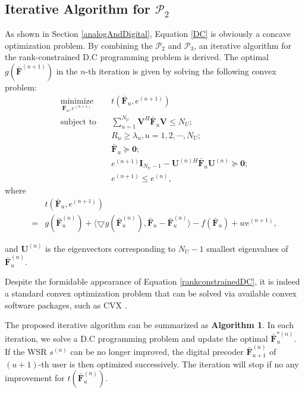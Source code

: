 \documentclass[10pt,journal,twocolumn,twoside]{IEEEtran}
\begin{document}
\subsection{Iterative Algorithm for $\mathcal{P}_2$}
As shown in Section \ref{analogAndDigital}, Equation \eqref{DC} is obviously a concave optimization problem.
By combining the $\mathcal{P}_2$ and $\mathcal{P}_3$, an iterative algorithm for the rank-constrained D.C programming problem is derived.
The optimal $g(\bar{\bm{F}}^{(n+1)})$ in the $n$-th iteration is given by solving the following convex problem:
\begin{align} \label{rankconstrainedDC}
\underset{\bar{\bm{F}}_u, e^{(n+1)}}{\text{minimize}}  & \quad  t(\bar{\bm{F}}_u, e^{(n+1)}) \\
\text{subject to}&\quad \sum_{u=1}^{N_U}\bm{V}^H \bar{\bm{F}}_u\bm{V} \leq N_U;\nonumber\\
& \quad R_{u}\geq \lambda_{u}, u = 1,2,\cdots, N_U;\nonumber\\
&\quad \bar{\bm{F}}_u \succeq \bm{0};\nonumber\\
&\quad e^{(n+1)}\bm{I}_{N_U-1} - \bm{U}^{(n)H} \bar{\bm{F}}_u \bm{U}^{(n)} \succeq \bm{0};\nonumber\\
&\quad e^{(n+1)} \leq e^{(n)},\nonumber
\end{align}
where
\begin{align}
 &t(\bar{\bm{F}}_u, e^{(n+1)})\nonumber\\
  = &g(\bar{\bm{F}}^{(n)}_u) + \langle \bigtriangledown g(\bar{\bm{F}}^{(n)}_u), \bar{\bm{F}}_u -  \bar{\bm{F}}_u^{(n)} \rangle  -  f(\bar{\bm{F}}_u) + w e^{(n+1)},\nonumber
\end{align}

 and $\bm{U}^{(n)}$ is the eigenvectors corresponding to $N_U-1$ smallest eigenvalues of  $\bar{\bm{F}}^{(n)}_u$.

Despite the formidable appearance of Equation \eqref{rankconstrainedDC}, it is indeed a standard convex optimization problem that can be solved via available convex software packages, such as CVX \cite{cvx}.

The proposed iterative algorithm can be summarized as \textbf{Algorithm 1}. In each iteration, we solve a D.C programming problem and update the optimal $\bar{\bm{F}}^{*(n)}_u$. If the WSR $s^{(n)}$ can be no longer improved, the digital precoder $\bar{\bm{F}}^{(n)}_{u+1}$ of $(u+1)$-th user is then optimized successively. The iteration will stop if no any improvement for $ t(\bar{\bm{F}}^{(n)}_{u})$.
\end{document}
